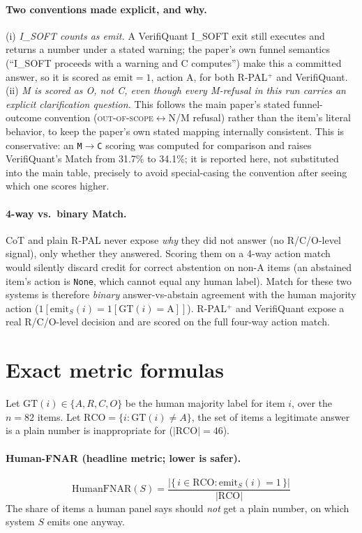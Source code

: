 \documentclass[11pt]{article}
\begin{document}
\paragraph{Two conventions made explicit, and why.}
(i) \emph{I\_SOFT counts as emit.} A VerifiQuant I\_SOFT exit still executes and returns a number
under a stated warning; the paper's own funnel semantics (``I\_SOFT proceeds with a warning and C
computes'') make this a committed answer, so it is scored as $\mathrm{emit}{=}1$, action A, for
both R-PAL$^{+}$ and VerifiQuant.
(ii) \emph{M is scored as O, not C, even though every M-refusal in this run carries an explicit
clarification question.} This follows the main paper's stated funnel-outcome convention
(\textsc{out-of-scope}$\leftrightarrow$N/M refusal) rather than the item's literal behavior, to
keep the paper's own stated mapping internally consistent. This is conservative: an
\texttt{M$\to$C} scoring was computed for comparison and raises VerifiQuant's Match from 31.7\%
to 34.1\%; it is reported here, not substituted into the main table, precisely to avoid
special-casing the convention after seeing which one scores higher.

\paragraph{4-way vs.\ binary Match.} CoT and plain R-PAL never expose \emph{why} they did not
answer (no R/C/O-level signal), only whether they answered. Scoring them on a 4-way action match
would silently discard credit for correct abstention on non-A items (an abstained item's
action is \texttt{None}, which cannot equal any human label). Match for these two systems is
therefore \emph{binary} answer-vs-abstain agreement with the human majority action
($1[\mathrm{emit}_S(i) = 1[\mathrm{GT}(i){=}\text{A}]]$). R-PAL$^{+}$ and VerifiQuant expose a
real R/C/O-level decision and are scored on the full four-way action match.

\section{Exact metric formulas}
Let $\mathrm{GT}(i)\in\{A,R,C,O\}$ be the human majority label for item $i$, over the
$n{=}82$ items. Let $\mathrm{RCO} = \{i : \mathrm{GT}(i)\neq A\}$, the set of items a legitimate
answer is a plain number is inappropriate for ($|\mathrm{RCO}|{=}46$).

\paragraph{Human-FNAR (headline metric; lower is safer).}
\[
\mathrm{HumanFNAR}(S) = \frac{\left|\{\, i \in \mathrm{RCO} : \mathrm{emit}_S(i){=}1 \,\}\right|}{|\mathrm{RCO}|}
\]
The share of items a human panel says should \emph{not} get a plain number, on which system $S$
emits one anyway.
\end{document}
